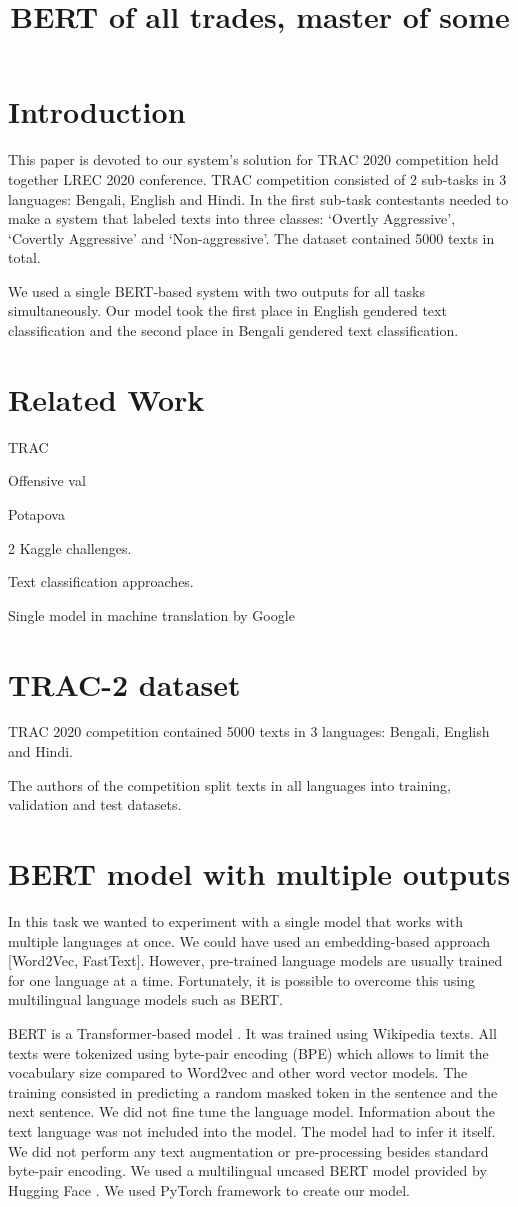 \documentclass[10pt, a4paper]{article}
\title{{BERT of all trades, master of some}}
\begin{document}
\maketitleabstract


\section{Introduction}
\label{intro}
This paper is devoted to our system's solution for TRAC 2020 competition held together LREC 2020 conference. TRAC competition consisted of 2 sub-tasks in 3 languages: Bengali, English and Hindi. In the first sub-task contestants needed to make a system that labeled texts into three classes: ‘Overtly Aggressive’, ‘Covertly Aggressive’ and ‘Non-aggressive’. The dataset contained 5000 texts in total.

We used a single BERT-based system with two outputs for all tasks simultaneously. Our model took the first place in English gendered text classification and the second place in Bengali gendered text classification.

\section{Related Work}
TRAC

Offensive val

Potapova

2 Kaggle challenges.

Text classification approaches.

Single model in machine translation by Google
\section{TRAC-2 dataset}
TRAC 2020 competition contained 5000 texts in 3 languages: Bengali, English and Hindi.

The authors of the competition split texts in all languages into training, validation and test datasets.
\section{BERT model with multiple outputs}
In this task we wanted to experiment with a single model that works with multiple languages at once. We could have used an embedding-based approach [Word2Vec, FastText]. However, pre-trained language models are usually trained for one language at a time.  Fortunately, it is possible to overcome this using multilingual language models such as BERT.

BERT \cite{bert} is a Transformer-based model \cite{attention}. It was trained using Wikipedia texts. All texts were tokenized using byte-pair encoding (BPE) which allows to limit the vocabulary size compared to Word2vec and other word vector models. The training consisted in predicting a random masked token in the sentence and the next sentence. We did not fine tune the language model. Information about the text language was not included into the model. The model had to infer it itself. We did not perform any text augmentation or pre-processing besides standard byte-pair encoding.
We used a multilingual uncased BERT model provided by Hugging Face \cite{Wolf2019HuggingFacesTS}. We used PyTorch framework to create our model.
\end{document}
